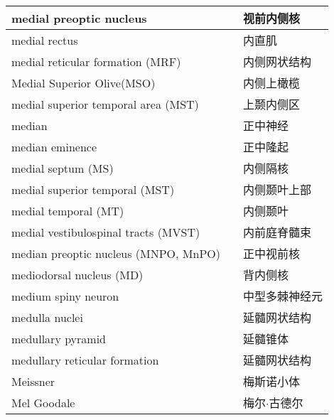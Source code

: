 \begin{longtable}{lll}
	\midrule
	medial preoptic nucleus    && 视前内侧核  \\
	
	\midrule
	medial rectus    && 内直肌  \\
	
	\midrule
	medial reticular formation (MRF)    && 内侧网状结构  \\
	
	\midrule
	Medial Superior Olive(MSO)   && 内侧上橄榄  \\
	
	\midrule
	medial superior temporal area (MST)   && 上颞内侧区  \\
	
	\midrule
	median   && 正中神经  \\
	
	\midrule
	median eminence   && 正中隆起  \\
	
	\midrule
	medial septum (MS)   && 内侧隔核  \\
	
	\midrule
	medial superior temporal (MST)   && 内侧颞叶上部  \\
	
	\midrule
	medial temporal (MT)   && 内侧颞叶  \\
	
	\midrule
	medial vestibulospinal tracts (MVST) && 内前庭脊髓束  \\
	
	\midrule
	median preoptic nucleus (MNPO, MnPO) && 正中视前核  \\
	
	\midrule
	mediodorsal nucleus (MD) && 背内侧核  \\
	
	\midrule
	medium spiny neuron && 中型多棘神经元 \\
	
	\midrule
	medulla nuclei && 延髓网状结构  \\
	
	\midrule
	medullary pyramid && 延髓锥体  \\
	
	\midrule
	medullary reticular formation && 延髓网状结构  \\
	
	\midrule
	Meissner && 梅斯诺小体  \\
	
	\midrule
	Mel Goodale && 梅尔$\cdot$古德尔  \\
	

\end{longtable}
